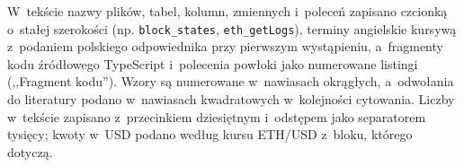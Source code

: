 W~tekście nazwy plików, tabel, kolumn, zmiennych i~poleceń zapisano czcionką o~stałej
szerokości (np. \texttt{block\_states}, \texttt{eth\_getLogs}), terminy angielskie kursywą
z~podaniem polskiego odpowiednika przy pierwszym wystąpieniu, a~fragmenty kodu źródłowego
TypeScript i~polecenia powłoki jako numerowane listingi (,,Fragment kodu''). Wzory są
numerowane w~nawiasach okrągłych, a~odwołania do literatury podano w~nawiasach kwadratowych
w~kolejności cytowania. Liczby w~tekście zapisano z~przecinkiem dziesiętnym i~odstępem jako
separatorem tysięcy; kwoty w~USD podano według kursu ETH/USD z~bloku, którego dotyczą.
